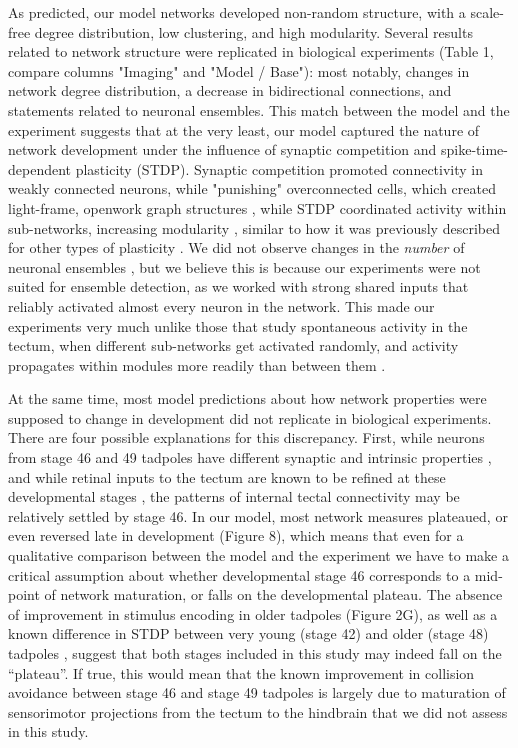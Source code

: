 \documentclass{article}
\begin{document}
As predicted, our model networks developed non-random structure, with a scale-free degree distribution, low clustering, and high modularity. Several results related to network structure were replicated in biological experiments (Table 1, compare columns "Imaging" and "Model / Base"): most notably, changes in network degree distribution, a decrease in bidirectional connections, and statements related to neuronal ensembles. This match between the model and the experiment suggests that at the very least, our model captured the nature of network development under the influence of synaptic competition and spike-time-dependent plasticity (STDP). Synaptic competition promoted connectivity in weakly connected neurons, while "punishing" overconnected cells, which created light-frame, openwork graph structures \citep{fiete2010chains}, while STDP coordinated activity within sub-networks, increasing modularity \citep{stam2010modular, litwin2014assemblies}, similar to how it was previously described for other types of plasticity \citep{damicelli2018topomod, triplett2018emergence}. We did not observe changes in the \textit{number} of neuronal ensembles \citep{avitan2017spontaneous, pietri2017emergence}, but we believe this is because our experiments were not suited for ensemble detection, as we worked with strong shared inputs that reliably activated almost every neuron in the network. This made our experiments very much unlike those that study spontaneous activity in the tectum, when different sub-networks get activated randomly, and activity propagates within modules more readily than between them \citep{avitan2017spontaneous}.

At the same time, most model predictions about how network properties were supposed to change in development did not replicate in biological experiments. There are four possible explanations for this discrepancy. First, while neurons from stage 46 and 49 tadpoles have different synaptic and intrinsic properties \citep{ciarleglio2015}, and while retinal inputs to the tectum are known to be refined at these developmental stages \citep{tao2005refinement, munz2014hebbian}, the patterns of internal tectal connectivity may be relatively settled by stage 46. In our model, most network measures plateaued, or even reversed late in development (Figure 8), which means that even for a qualitative comparison between the model and the experiment we have to make a critical assumption about whether developmental stage 46 corresponds to a mid-point of network maturation, or falls on the developmental plateau. The absence of improvement in stimulus encoding in older tadpoles (Figure 2G), as well as a known difference in STDP between very young (stage 42) and older (stage 48) tadpoles \citep{richards2010stdp, tsui2010developmental}, suggest that both stages included in this study may indeed fall on the “plateau”. If true, this would mean that the known improvement in collision avoidance between stage 46 and stage 49 tadpoles \citep{dong2009} is largely due to maturation of sensorimotor projections from the tectum to the hindbrain that we did not assess in this study.
\end{document}
